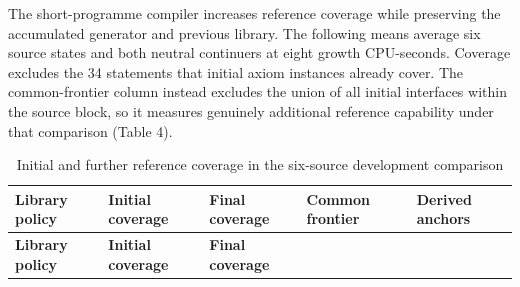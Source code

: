 \documentclass[pdflatex,sn-basic,Numbered]{sn-jnl}
\begin{document}
The short-programme compiler increases reference coverage while preserving the accumulated generator and previous library. The following means average six source states and both neutral continuers at eight growth CPU-seconds. Coverage excludes the 34 statements that initial axiom instances already cover. The common-frontier column instead excludes the union of all initial interfaces within the source block, so it measures genuinely additional reference capability under that comparison (Table 4).

\begingroup
\small
\setlength{\tabcolsep}{3pt}
\renewcommand{\arraystretch}{1.13}

\begin{longtable}[]{@{}
  >{\raggedright\arraybackslash}p{}
  >{\raggedleft\arraybackslash}p{}
  >{\raggedleft\arraybackslash}p{}
  >{\raggedleft\arraybackslash}p{}
  >{\raggedleft\arraybackslash}p{}@{}}
\caption{Initial and further reference coverage in the six-source development comparison}\label{tab:4}\tabularnewline
\toprule\noalign{}
\begin{minipage}[b]{\linewidth}\raggedright
\textbf{Library policy}
\end{minipage} & \begin{minipage}[b]{\linewidth}\raggedleft
\textbf{Initial coverage}
\end{minipage} & \begin{minipage}[b]{\linewidth}\raggedleft
\textbf{Final coverage}
\end{minipage} & \begin{minipage}[b]{\linewidth}\raggedleft
\textbf{Common frontier}
\end{minipage} & \begin{minipage}[b]{\linewidth}\raggedleft
\textbf{Derived anchors}
\end{minipage} \\
\midrule\noalign{}
\endfirsthead
\toprule\noalign{}
\begin{minipage}[b]{\linewidth}\raggedright
\textbf{Library policy}
\end{minipage} & \begin{minipage}[b]{\linewidth}\raggedleft
\textbf{Initial coverage}
\end{minipage} & \begin{minipage}[b]{\linewidth}\raggedleft
\textbf{Final coverage}

\end{minipage}
\end{longtable}
\end{document}

